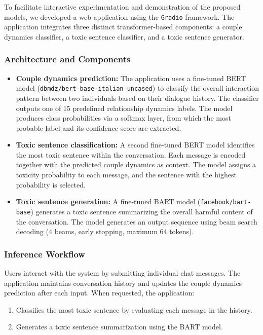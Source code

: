 \documentclass[conference]{IEEEtran}
\begin{document}
To facilitate interactive experimentation and demonstration of the proposed models, we developed a web application using the \texttt{Gradio} framework. The application integrates three distinct transformer-based components: a couple dynamics classifier, a toxic sentence classifier, and a toxic sentence generator. 

\subsubsection{Architecture and Components}
\begin{itemize}
    \item \textbf{Couple dynamics prediction:} The application uses a fine-tuned BERT model (\texttt{dbmdz/bert-base-italian-uncased}) to classify the overall interaction pattern between two individuals based on their dialogue history. The classifier outputs one of 15 predefined relationship dynamics labels. The model produces class probabilities via a softmax layer, from which the most probable label and its confidence score are extracted.
    
    \item \textbf{Toxic sentence classification:} A second fine-tuned BERT model identifies the most toxic sentence within the conversation. Each message is encoded together with the predicted couple dynamics as context. The model assigns a toxicity probability to each message, and the sentence with the highest probability is selected.
    
    \item \textbf{Toxic sentence generation:} A fine-tuned BART model (\texttt{facebook/bart-base}) generates a toxic sentence summarizing the overall harmful content of the conversation. The model generates an output sequence using beam search decoding (4 beams, early stopping, maximum 64 tokens).
\end{itemize}

\subsubsection{Inference Workflow}
Users interact with the system by submitting individual chat messages. The application maintains conversation history and updates the couple dynamics prediction after each input. When requested, the application:
\begin{enumerate}
    \item Classifies the most toxic sentence by evaluating each message in the history.
    \item Generates a toxic sentence summarization using the BART model.
\end{enumerate}
\end{document}
